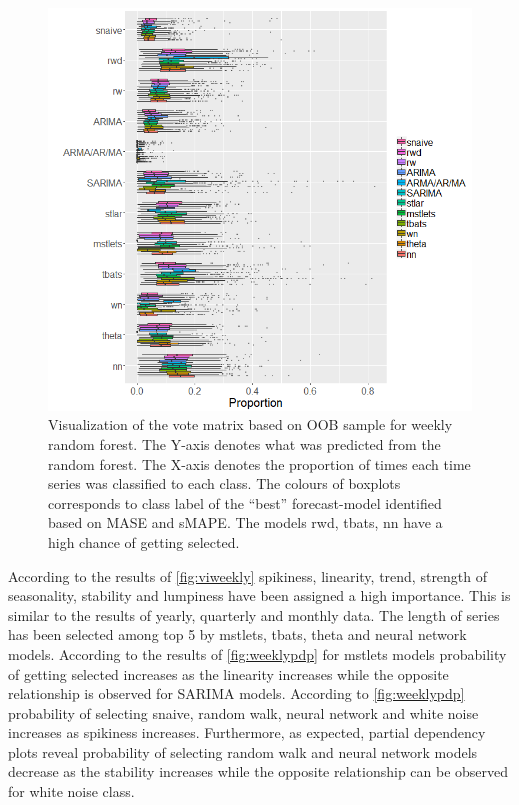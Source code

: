 \documentclass[11pt,a4paper,]{article}
\begin{document}
\begin{figure}
\centering
\includegraphics{figures/oobweekly-1.png}
\caption{\label{fig:oobweekly}Visualization of the vote matrix based on OOB
sample for weekly random forest. The Y-axis denotes what was predicted
from the random forest. The X-axis denotes the proportion of times each
time series was classified to each class. The colours of boxplots
corresponds to class label of the ``best'' forecast-model identified
based on MASE and sMAPE. The models rwd, tbats, nn have a high chance of
getting selected.}
\end{figure}

\clearpage

According to the results of \autoref{fig:viweekly} spikiness, linearity,
trend, strength of seasonality, stability and lumpiness have been
assigned a high importance. This is similar to the results of yearly,
quarterly and monthly data. The length of series has been selected among
top 5 by mstlets, tbats, theta and neural network models. According to
the results of \autoref{fig:weeklypdp} for mstlets models probability of
getting selected increases as the linearity increases while the opposite
relationship is observed for SARIMA models. According to
\autoref{fig:weeklypdp} probability of selecting snaive, random walk,
neural network and white noise increases as spikiness increases.
Furthermore, as expected, partial dependency plots reveal probability of
selecting random walk and neural network models decrease as the
stability increases while the opposite relationship can be observed for
white noise class.
\end{document}
